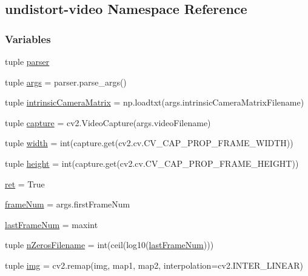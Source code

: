 \hypertarget{namespaceundistort-video}{\subsection{undistort-\/video Namespace Reference}
\label{namespaceundistort-video}
}
\subsubsection*{Variables}
\begin{DoxyCompactItemize}
\item 
tuple \hyperlink{namespaceundistort-video_a314addd602a3ab3a009e869d097d9fe0}{parser}
\item 
tuple \hyperlink{namespaceundistort-video_a20afbfc87021440bd19e2857ee5c0433}{args} = parser.\-parse\-\_\-args()
\item 
tuple \hyperlink{namespaceundistort-video_a951e4cadc09785e61bc64253f57ce464}{intrinsic\-Camera\-Matrix} = np.\-loadtxt(args.\-intrinsic\-Camera\-Matrix\-Filename)
\item 
tuple \hyperlink{namespaceundistort-video_a00bef9154ed9c32f455fd219314fe791}{capture} = cv2.\-Video\-Capture(args.\-video\-Filename)
\item 
tuple \hyperlink{namespaceundistort-video_adb4ad8deb16a759496b005486002c537}{width} = int(capture.\-get(cv2.\-cv.\-C\-V\-\_\-\-C\-A\-P\-\_\-\-P\-R\-O\-P\-\_\-\-F\-R\-A\-M\-E\-\_\-\-W\-I\-D\-T\-H))
\item 
tuple \hyperlink{namespaceundistort-video_a61478fbe5632ba582850efa0107e6852}{height} = int(capture.\-get(cv2.\-cv.\-C\-V\-\_\-\-C\-A\-P\-\_\-\-P\-R\-O\-P\-\_\-\-F\-R\-A\-M\-E\-\_\-\-H\-E\-I\-G\-H\-T))
\item 
\hyperlink{namespaceundistort-video_a5cf3044f0af40203e21a7231c2de5548}{ret} = True
\item 
\hyperlink{namespaceundistort-video_a80fb79bd13dda4c7d9cd257b402bef02}{frame\-Num} = args.\-first\-Frame\-Num
\item 
\hyperlink{namespaceundistort-video_a5637c9a1435b629b47668f6469dd7029}{last\-Frame\-Num} = maxint
\item 
tuple \hyperlink{namespaceundistort-video_abf76aea4e927f0a4a625e9f7032e0ff5}{n\-Zeros\-Filename} = int(ceil(log10(\hyperlink{namespaceundistort-video_a5637c9a1435b629b47668f6469dd7029}{last\-Frame\-Num})))
\item 
tuple \hyperlink{namespaceundistort-video_a22a7a4e91d80b5f2cad6f8b9bd83c481}{img} = cv2.\-remap(img, map1, map2, interpolation=cv2.\-I\-N\-T\-E\-R\-\_\-\-L\-I\-N\-E\-A\-R)
\end{DoxyCompactItemize}


